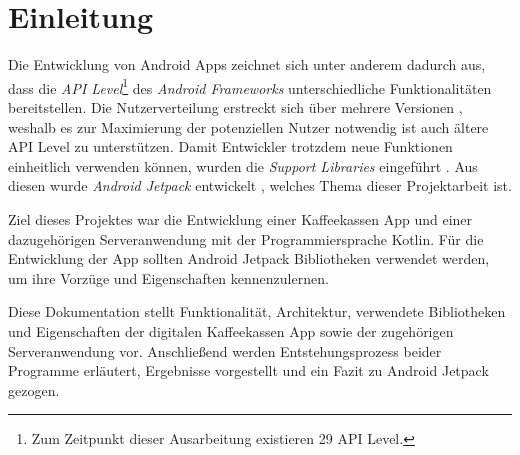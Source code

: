 \chapter*{Einleitung}
\label{ch:intro}
Die Entwicklung von Android Apps zeichnet sich unter anderem dadurch aus, dass die \textit{API Level}\footnote{Zum Zeitpunkt dieser Ausarbeitung existieren 29 API Level.} des \textit{Android Frameworks} unterschiedliche Funktionalitäten bereitstellen.
Die Nutzerverteilung erstreckt sich über mehrere Versionen \autocite{androidhistory}, weshalb es zur Maximierung der potenziellen Nutzer notwendig ist auch ältere API Level zu unterstützen.
Damit Entwickler trotzdem neue Funktionen einheitlich verwenden können, wurden die \textit{Support Libraries} eingeführt \autocite{supportlibraries}.
Aus diesen wurde \textit{Android Jetpack} entwickelt \autocite{androidjetpack}, welches Thema dieser Projektarbeit ist.

Ziel dieses Projektes war die Entwicklung einer Kaffeekassen App und einer dazugehörigen Serveranwendung mit der Programmiersprache Kotlin.
Für die Entwicklung der App sollten Android Jetpack Bibliotheken verwendet werden, um ihre Vorzüge und Eigenschaften kennenzulernen.

Diese Dokumentation stellt Funktionalität, Architektur, verwendete Bibliotheken und Eigenschaften der digitalen Kaffeekassen App sowie der zugehörigen Serveranwendung vor.
Anschließend werden Entstehungsprozess beider Programme erläutert, Ergebnisse vorgestellt und ein Fazit zu Android Jetpack gezogen.
